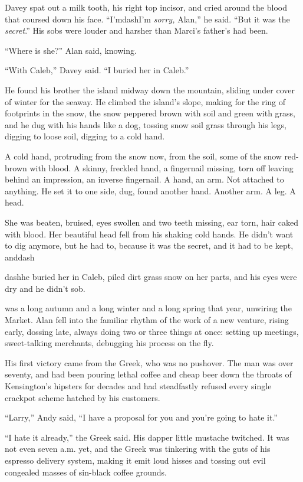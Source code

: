 Davey spat out a milk tooth, his right top incisor, and cried around
the blood that coursed down his face.  ``I'mdash{}I'm \textit{sorry,}
Alan,'' he said.  ``But it was the \textit{secret}.'' His sobs were
louder and harsher than Marci's father's had been.

``Where is she?'' Alan said, knowing.

``With Caleb,'' Davey said.  ``I buried her in Caleb.''

He found his brother the island midway down the mountain, sliding
under cover of winter for the seaway.  He climbed the island's slope,
making for the ring of footprints in the snow, the snow peppered brown
with soil and green with grass, and he dug with his hands like a dog,
tossing snow soil grass through his legs, digging to loose soil,
digging to a cold hand.

A cold hand, protruding from the snow now, from the soil, some of the
snow red-brown with blood.  A skinny, freckled hand, a fingernail
missing, torn off leaving behind an impression, an inverse fingernail. 
A hand, an arm.  Not attached to anything.  He set it to one side,
dug, found another hand.  Another arm.  A leg.  A head.

She was beaten, bruised, eyes swollen and two teeth missing, ear torn,
hair caked with blood.  Her beautiful head fell from his shaking cold
hands.  He didn't want to dig anymore, but he had to, because it was
the secret, and it had to be kept, anddash{}

dash{}he buried her in Caleb, piled dirt grass snow on her parts, and his
eyes were dry and he didn't sob.

 was a long autumn and a long winter and a long spring that year,
unwiring the Market.  Alan fell into the familiar rhythm of the work
of a new venture, rising early, dossing late, always doing two or
three things at once:  setting up meetings, sweet-talking merchants,
debugging his process on the fly.

His first victory came from the Greek, who was no pushover.  The man
was over seventy, and had been pouring lethal coffee and cheap beer
down the throats of Kensington's hipsters for decades and had
steadfastly refused every single crackpot scheme hatched by his
customers.

``Larry,'' Andy said, ``I have a proposal for you and you're going to
hate it.''

``I hate it already,'' the Greek said.  His dapper little mustache
twitched.  It was not even seven a.m.  yet, and the Greek was
tinkering with the guts of his espresso delivery system, making it
emit loud hisses and tossing out evil congealed masses of sin-black
coffee grounds.

